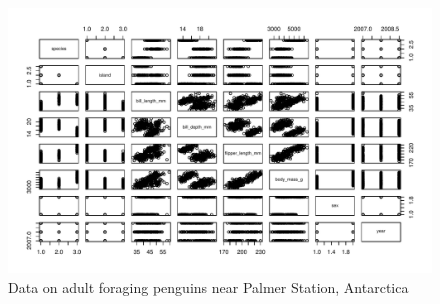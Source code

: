 \documentclass{article}\usepackage[]{graphicx}\usepackage[]{xcolor}
\begin{document}
\begin{figure}[H]
\begin{center}
\includegraphics[scale=0.75]{figure/penguins.pdf}
\caption{Data on adult foraging penguins near Palmer Station, Antarctica}
\label{plot2}
\end{center}
\end{figure}
\end{document}
